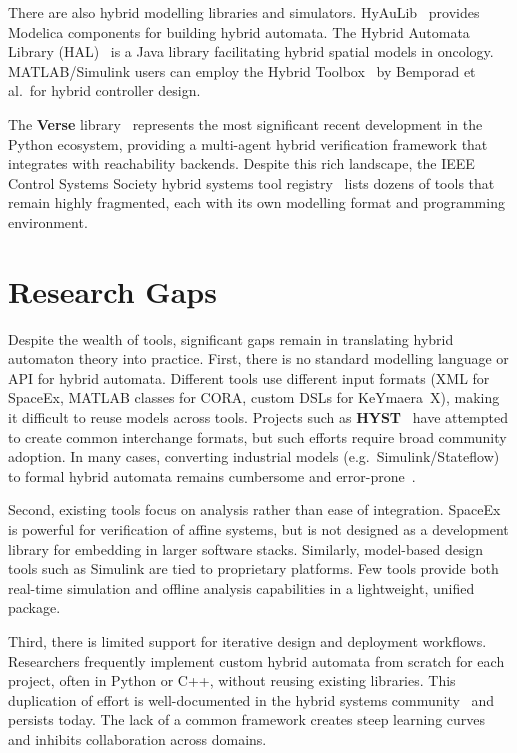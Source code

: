 \documentclass[a4paper, 12pt]{report}
\begin{document}
There are also hybrid modelling libraries and simulators.  HyAuLib~\cite{HyAuLib}
provides Modelica components for building hybrid automata.  The Hybrid
Automata Library (HAL)~\cite{Bravo2019HAL} is a Java library facilitating
hybrid spatial models in oncology.  MATLAB/Simulink users can employ the
Hybrid Toolbox~\cite{Bemporad2005HybridToolbox} by Bemporad et al.\ for
hybrid controller design.

The \textbf{Verse} library~\cite{Li2023VERSE} represents the most
significant recent development in the Python ecosystem, providing a
multi-agent hybrid verification framework that integrates with reachability
backends.  Despite this rich landscape, the IEEE Control Systems Society
hybrid systems tool registry~\cite{IEEEHybridRegistry} lists dozens of
tools that remain highly fragmented, each with its own modelling format and
programming environment.

\section{Research Gaps}

Despite the wealth of tools, significant gaps remain in translating hybrid
automaton theory into practice.  First, there is no standard modelling
language or API for hybrid automata.  Different tools use different input
formats (XML for SpaceEx, MATLAB classes for CORA, custom DSLs for
KeYmaera~X), making it difficult to reuse models across tools.  Projects
such as \textbf{HYST}~\cite{Bak2015HYST} have attempted to create common
interchange formats, but such efforts require broad community adoption.  In
many cases, converting industrial models (e.g.\ Simulink/Stateflow) to
formal hybrid automata remains cumbersome and
error-prone~\cite{Fan2016C2E2,Bak2015HYST}.

Second, existing tools focus on analysis rather than ease of integration.
SpaceEx~\cite{Frehse2011SpaceEx} is powerful for verification of affine
systems, but is not designed as a development library for embedding in
larger software stacks.  Similarly, model-based design tools such as
Simulink are tied to proprietary platforms.  Few tools provide both
real-time simulation and offline analysis capabilities in a lightweight,
unified package.

Third, there is limited support for iterative design and deployment
workflows.  Researchers frequently implement custom hybrid automata from
scratch for each project, often in Python or C++, without reusing existing
libraries.  This duplication of effort is well-documented in the hybrid
systems community~\cite{Alur1993Hybrid,Henzinger1996} and persists today.
The lack of a common framework creates steep learning curves and inhibits
collaboration across domains.
\end{document}
